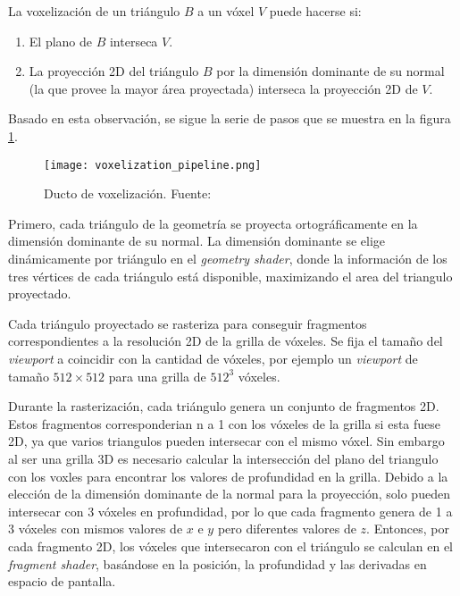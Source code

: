 La voxelización de un triángulo $B$ a un vóxel $V$ puede hacerse si:

\begin{enumerate}
    \item El plano de $B$ interseca $V$.
    \item La proyección 2D del triángulo $B$ por la dimensión dominante de su normal (la que provee la mayor área proyectada) interseca la proyección 2D de $V$.
\end{enumerate}

Basado en esta observación, se sigue la serie de pasos que se muestra en la figura \ref{fig:voxelization_pipeline}.

\begin{figure}[h!]
    \centering
    \texttt{[image: voxelization\_pipeline.png]}
    \caption{Ducto de voxelización. Fuente: \cite{opengl-insights}}
    \label{fig:voxelization_pipeline}
\end{figure}

Primero, cada triángulo de la geometría se proyecta ortográficamente en la dimensión dominante de su normal.
La dimensión dominante se elige dinámicamente por triángulo en el \textit{geometry shader}, donde la información de los tres vértices de cada triángulo está disponible,
maximizando el area del triangulo proyectado.

Cada triángulo proyectado se rasteriza para conseguir fragmentos correspondientes a la resolución 2D de la grilla de vóxeles.
Se fija el tamaño del \textit{viewport} a coincidir con la cantidad de vóxeles, por ejemplo un \textit{viewport} de tamaño $512\times512$ para una grilla de $512^3$ vóxeles.

Durante la rasterización, cada triángulo genera un conjunto de fragmentos 2D. Estos fragmentos corresponderian n a 1 con los vóxeles de la grilla si esta fuese 2D, ya que varios triangulos pueden intersecar con el mismo vóxel.
Sin embargo al ser una grilla 3D es necesario calcular la intersección del plano del triangulo con los voxles para encontrar los valores de profundidad en la grilla.
Debido a la elección de la dimensión dominante de la normal para la proyección, solo pueden intersecar con 3 vóxeles en profundidad, por lo que cada fragmento genera de 1 a 3 vóxeles con mismos valores de $x$ e $y$ pero diferentes valores de $z$. %
Entonces, por cada fragmento 2D, los vóxeles que intersecaron con el triángulo se calculan en el \textit{fragment shader}, basándose en la posición, la profundidad y las derivadas en espacio de pantalla. %

